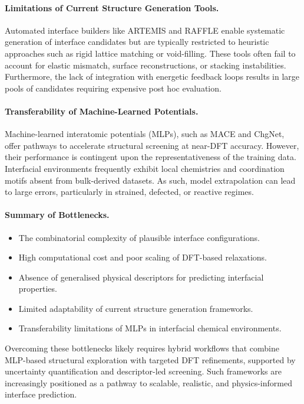 \paragraph{Limitations of Current Structure Generation Tools.} Automated interface builders like ARTEMIS and RAFFLE enable systematic generation of interface candidates but are typically restricted to heuristic approaches such as rigid lattice matching or void-filling. These tools often fail to account for elastic mismatch, surface reconstructions, or stacking instabilities. Furthermore, the lack of integration with energetic feedback loops results in large pools of candidates requiring expensive post hoc evaluation. 
 
\paragraph{Transferability of Machine-Learned Potentials.} Machine-learned interatomic potentials (MLPs), such as MACE and ChgNet, offer pathways to accelerate structural screening at near-DFT accuracy. However, their performance is contingent upon the representativeness of the training data. Interfacial environments frequently exhibit local chemistries and coordination motifs absent from bulk-derived datasets. As such, model extrapolation can lead to large errors, particularly in strained, defected, or reactive regimes. 
 
\paragraph{Summary of Bottlenecks.} \begin{itemize} \item The combinatorial complexity of plausible interface configurations. \item High computational cost and poor scaling of DFT-based relaxations. \item Absence of generalised physical descriptors for predicting interfacial properties. \item Limited adaptability of current structure generation frameworks. \item Transferability limitations of MLPs in interfacial chemical environments. \end{itemize} 
 
Overcoming these bottlenecks likely requires hybrid workflows that combine MLP-based structural exploration with targeted DFT refinements, supported by uncertainty quantification and descriptor-led screening. Such frameworks are increasingly positioned as a pathway to scalable, realistic, and physics-informed interface prediction. 
 
